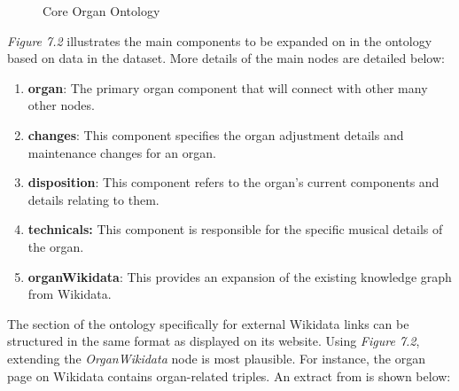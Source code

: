 \begin{figure}[H]
    \begin{center}
    \end{center}
    \vspace{-0.4cm}
\caption{Core Organ Ontology}
\end{figure}
\vspace{-0.1cm}

\textit{Figure 7.2} illustrates the main components to be expanded on in the ontology based on data in the dataset. More details of the main nodes are detailed below:

\begin{enumerate}
    \item \textbf{organ}: The primary organ component that will connect with other many other nodes.
    \item \textbf{changes}: This component specifies the organ adjustment details and maintenance changes for an organ.
    \item \textbf{disposition}: This component refers to the organ's current components and details relating to them.
    \item \textbf{technicals:} This component is responsible for the specific musical details of the organ. 
    \item \textbf{organWikidata}: This provides an expansion of the existing knowledge graph from Wikidata.
\end{enumerate}

The section of the ontology specifically for external Wikidata links can be structured in the same format as displayed on its website. Using \textit{Figure 7.2}, extending the \textit{OrganWikidata} node is most plausible. For instance, the organ page on Wikidata \cite{organwikidata} contains organ-related triples. An extract from \cite{organwikidata} is shown below:

